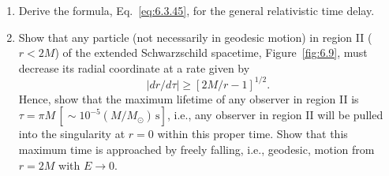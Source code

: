 \begin{enumerate}[label=\arabic*., leftmargin=*, itemsep=1.1em]
\item Derive the formula, Eq.~\eqref{eq:6.3.45}, for the general relativistic time
  delay.

\item Show that any particle (not necessarily in geodesic motion) in region II
  (\(r<2M\)) of the extended Schwarzschild spacetime, Figure~\ref{fig:6.9}, must
  decrease its radial coordinate at a rate given by
  \[
    \left|dr/d\tau\right|\geq[2M/r-1]^{1/2}.
  \]
  Hence, show that the maximum lifetime of any observer in region II is
  \(\tau=\pi M\,[\sim10^{-5}(M/M_\odot)\,\mathrm{s}]\), i.e., any observer in
  region II will be pulled into the singularity at \(r=0\) within this proper
  time. Show that this maximum time is approached by freely falling, i.e.,
  geodesic, motion from \(r=2M\) with \(E\to0\).
\end{enumerate}
